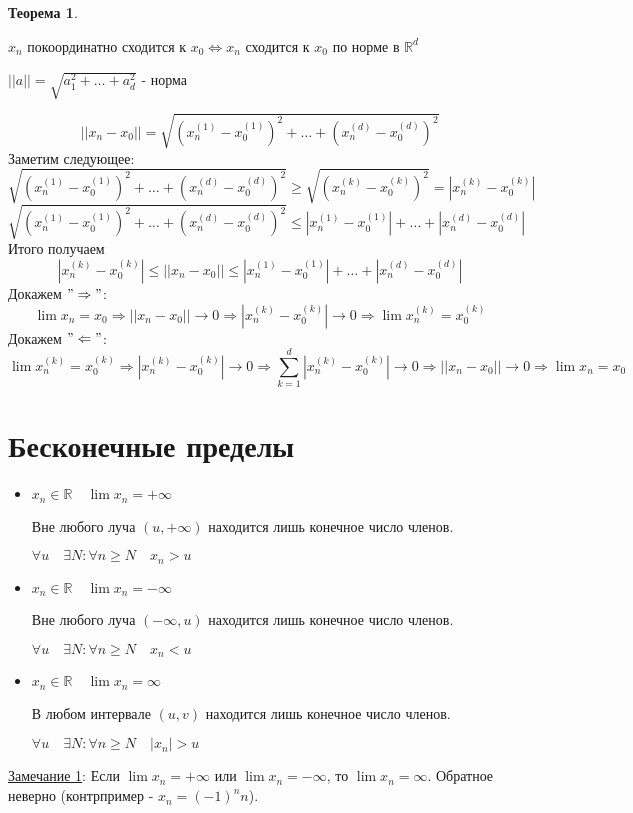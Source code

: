 \documentclass[12pt,letterpaper]{report}
\makeatletter
\newtheorem*{theorem-non}{Теорема}
\theoremstyle{definition}
\renewenvironment{proof}[1][\proofname]{%
   \par\pushQED{\qed}\normalfont%
   \topsep6\p@\@plus6\p@\relax
   \trivlist\item[\hskip\labelsep\bfseries#1\@addpunct{.}]%
   \ignorespaces
}{%
   \popQED\endtrivlist\@endpefalse
}
\makeatother
\begin{document}
    \begin{theorem-non} \end{theorem-non}
    $x_n$ покоординатно сходится к $x_0 \Longleftrightarrow x_n$ сходится к $x_0$ по норме в $\mathbb{R}^d$ 
    
    $||a|| = \sqrt{a_1^2 + \dots + a_d^2}$ - норма
    
    \begin{proof}
        \[ ||x_n - x_0|| = \sqrt{(x_n^{(1)} - x_0^{(1)})^2 + \dots + (x_n^{(d)} - x_0^{(d)})^2} \]
        Заметим следующее: 
        \[ \sqrt{(x_n^{(1)} - x_0^{(1)})^2 + \dots + (x_n^{(d)} - x_0^{(d)})^2} \geqslant \sqrt{(x_n^{(k)} - x_0^{(k)})^2} = |x_n^{(k)} - x_0^{(k)}| \]
        \[  \sqrt{(x_n^{(1)} - x_0^{(1)})^2 + \dots + (x_n^{(d)} - x_0^{(d)})^2} \leqslant |x_n^{(1)} - x_0^{(1)}| + \dots + |x_n^{(d)} - x_0^{(d)}| \]
        Итого получаем
        \[ |x_n^{(k)} - x_0^{(k)}| \leqslant ||x_n - x_0|| \leqslant |x_n^{(1)} - x_0^{(1)}| + \dots + |x_n^{(d)} - x_0^{(d)}| \]
        Докажем $"\Rightarrow"$:
        \[ \lim x_n = x_0 \Rightarrow ||x_n - x_0|| \to 0 \Rightarrow  |x_n^{(k)} - x_0^{(k)}| \to 0 \Rightarrow \lim x_n^{(k)} = x_0^{(k)} \]
        Докажем $"\Leftarrow"$:
        \[ \lim x_n^{(k)} = x_0^{(k)} \Rightarrow |x_n^{(k)} - x_0^{(k)}| \to 0 \Rightarrow \sum_{k = 1}^d |x_n^{(k)} - x_0^{(k)}| \to 0 \Rightarrow ||x_n - x_0|| \to 0 \Rightarrow \lim x_n = x_0  \]
    \end{proof}
    
    \section{Бесконечные пределы}
    \begin{itemize}
        \item \underline{$x_n \in \mathbb{R} \quad \lim x_n = +\infty$}
        
        Вне любого луча $(u, +\infty)$ находится лишь конечное число членов.
        
        $\forall u\quad \exists N: \forall n \geqslant N \quad x_n > u$
        \item \underline{$x_n \in \mathbb{R} \quad \lim x_n = -\infty$}
        
        Вне любого луча $(-\infty, u)$ находится лишь конечное число членов.
        
        $\forall u\quad \exists N: \forall n \geqslant N \quad x_n < u$
        
        \item \underline{$x_n \in \mathbb{R} \quad \lim x_n = \infty$}
        
        В любом интервале $(u, v)$ находится лишь конечное число членов.
        
        $\forall u\quad \exists N: \forall n \geqslant N \quad |x_n| > u$
    \end{itemize} 
    \vspace{0.7cm}
    \underline{Замечание 1}: Если $\lim x_n = +\infty$ или $\lim x_n = -\infty$, то $\lim x_n = \infty$. Обратное неверно (контрпример - $x_n = (-1)^nn$).
    
\end{document}
